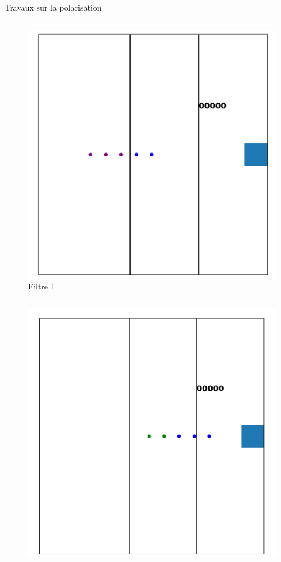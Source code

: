 \documentclass[french]{beamer}
\begin{document}
\begin{frame}{Travaux sur la polarisation}
\begin{columns}
\begin{column}{0.5\textwidth}
\begin{figure}
                \includegraphics[scale=0.05]{Filtre1.png}
                \caption{\small Filtre 1}
            \end{figure}
        \end{column}
    \end{columns}
    \begin{columns}
        \begin{column}{0.5\textwidth}
            \begin{figure}
                \captionsetup{labelformat=empty}
                \includegraphics[scale=0.05]{Filtre2.png}

\end{figure}
\end{column}
\end{columns}
\end{frame}
\end{document}
